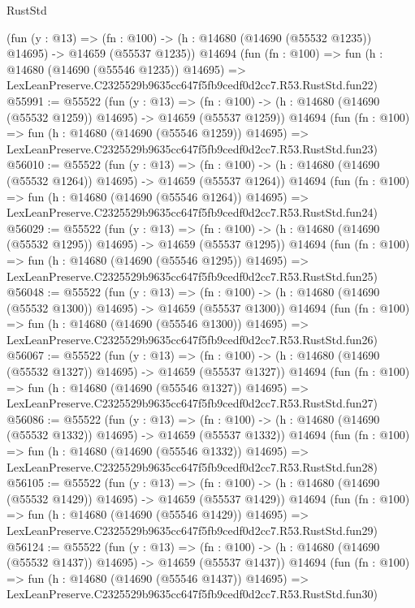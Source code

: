 \begin{lexlean}{RustStd}
\begin{coremodule}
    (fun (y : @13) =>
    (fn : @100) -> (h : @14680 (@14690 (@55532 @1235)) @14695) -> @14659 (@55537 @1235))
    @14694
    (fun (fn : @100) =>
    fun (h : @14680 (@14690 (@55546 @1235)) @14695) =>
    LexLeanPreserve.C2325529b9635cc647f5fb9cedf0d2cc7.R53.RustStd.fun22)
@55991 := @55522
    (fun (y : @13) =>
    (fn : @100) -> (h : @14680 (@14690 (@55532 @1259)) @14695) -> @14659 (@55537 @1259))
    @14694
    (fun (fn : @100) =>
    fun (h : @14680 (@14690 (@55546 @1259)) @14695) =>
    LexLeanPreserve.C2325529b9635cc647f5fb9cedf0d2cc7.R53.RustStd.fun23)
@56010 := @55522
    (fun (y : @13) =>
    (fn : @100) -> (h : @14680 (@14690 (@55532 @1264)) @14695) -> @14659 (@55537 @1264))
    @14694
    (fun (fn : @100) =>
    fun (h : @14680 (@14690 (@55546 @1264)) @14695) =>
    LexLeanPreserve.C2325529b9635cc647f5fb9cedf0d2cc7.R53.RustStd.fun24)
@56029 := @55522
    (fun (y : @13) =>
    (fn : @100) -> (h : @14680 (@14690 (@55532 @1295)) @14695) -> @14659 (@55537 @1295))
    @14694
    (fun (fn : @100) =>
    fun (h : @14680 (@14690 (@55546 @1295)) @14695) =>
    LexLeanPreserve.C2325529b9635cc647f5fb9cedf0d2cc7.R53.RustStd.fun25)
@56048 := @55522
    (fun (y : @13) =>
    (fn : @100) -> (h : @14680 (@14690 (@55532 @1300)) @14695) -> @14659 (@55537 @1300))
    @14694
    (fun (fn : @100) =>
    fun (h : @14680 (@14690 (@55546 @1300)) @14695) =>
    LexLeanPreserve.C2325529b9635cc647f5fb9cedf0d2cc7.R53.RustStd.fun26)
@56067 := @55522
    (fun (y : @13) =>
    (fn : @100) -> (h : @14680 (@14690 (@55532 @1327)) @14695) -> @14659 (@55537 @1327))
    @14694
    (fun (fn : @100) =>
    fun (h : @14680 (@14690 (@55546 @1327)) @14695) =>
    LexLeanPreserve.C2325529b9635cc647f5fb9cedf0d2cc7.R53.RustStd.fun27)
@56086 := @55522
    (fun (y : @13) =>
    (fn : @100) -> (h : @14680 (@14690 (@55532 @1332)) @14695) -> @14659 (@55537 @1332))
    @14694
    (fun (fn : @100) =>
    fun (h : @14680 (@14690 (@55546 @1332)) @14695) =>
    LexLeanPreserve.C2325529b9635cc647f5fb9cedf0d2cc7.R53.RustStd.fun28)
@56105 := @55522
    (fun (y : @13) =>
    (fn : @100) -> (h : @14680 (@14690 (@55532 @1429)) @14695) -> @14659 (@55537 @1429))
    @14694
    (fun (fn : @100) =>
    fun (h : @14680 (@14690 (@55546 @1429)) @14695) =>
    LexLeanPreserve.C2325529b9635cc647f5fb9cedf0d2cc7.R53.RustStd.fun29)
@56124 := @55522
    (fun (y : @13) =>
    (fn : @100) -> (h : @14680 (@14690 (@55532 @1437)) @14695) -> @14659 (@55537 @1437))
    @14694
    (fun (fn : @100) =>
    fun (h : @14680 (@14690 (@55546 @1437)) @14695) =>
    LexLeanPreserve.C2325529b9635cc647f5fb9cedf0d2cc7.R53.RustStd.fun30)

\end{coremodule}
\end{lexlean}
